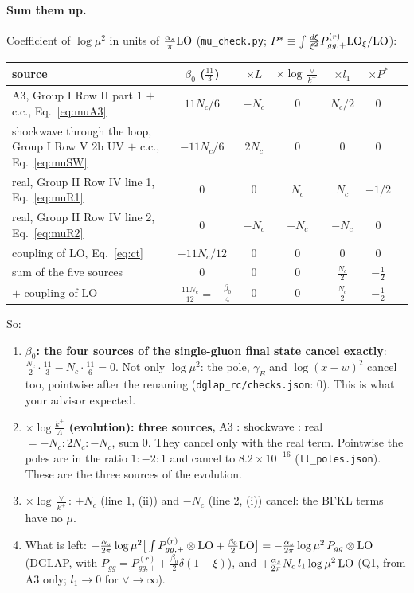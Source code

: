 \documentclass[10pt]{article}
\numberwithin{equation}{section}
\begin{document}
\paragraph{Sum them up.} Coefficient of $\log\mu^2$ in units of $\frac{\alpha_s}{\pi}{\rm LO}$ (\texttt{mu\_check.py}; $P^*\equiv\int\frac{d\xi}{\xi^2}P^{(r)}_{gg,+}{\rm LO}_\xi/{\rm LO}$):
{\small
\begin{longtable}{@{}p{}cccccc@{}}\toprule
source & $\beta_0$ ($\frac{11}{3}$) & $\times L$ & $\times\log\frac{\vee}{k^+}$ & $\times l_1$ & $\times P^*$\\\midrule
A3, Group I Row II part 1 $+$ c.c., Eq.~\eqref{eq:muA3} & $11N_c/6$ & $-N_c$ & $0$ & $N_c/2$ & $0$\\
shockwave through the loop, Group I Row V 2b UV $+$ c.c., Eq.~\eqref{eq:muSW} & $-11N_c/6$ & $2N_c$ & $0$ & $0$ & $0$\\
real, Group II Row IV line 1, Eq.~\eqref{eq:muR1} & $0$ & $0$ & $N_c$ & $N_c$ & $-1/2$\\
real, Group II Row IV line 2, Eq.~\eqref{eq:muR2} & $0$ & $-N_c$ & $-N_c$ & $-N_c$ & $0$\\
coupling of LO, Eq.~\eqref{eq:ct} & $-11N_c/12$ & $0$ & $0$ & $0$ & $0$\\
\midrule
sum of the five sources & $0$ & $0$ & $0$ & $\frac{N_c}{2}$ & $-\frac12$\\
$+$ coupling of LO & $-\frac{11N_c}{12}=-\frac{\beta_0}{4}$ & $0$ & $0$ & $\frac{N_c}{2}$ & $-\frac12$\\\bottomrule
\end{longtable}}
\noindent So:
\begin{enumerate}
\item \textbf{$\beta_0$: the four sources of the single-gluon final state cancel exactly}: $\frac{N_c}{2}\cdot\frac{11}{3}-N_c\cdot\frac{11}{6}=0$. Not only $\log\mu^2$: the pole, $\gamma_E$ and $\log(x-w)^2$ cancel too, pointwise after the renaming (\texttt{dglap\_rc/checks.json}: $0$). This is what your advisor expected.
\item \textbf{$\times\log\frac{k^+}{\Lambda}$ (evolution): three sources}, A3 : shockwave : real $=-N_c:2N_c:-N_c$, sum $0$. They cancel only with the real term. Pointwise the poles are in the ratio $1:-2:1$ and cancel to $8.2\times10^{-16}$ (\texttt{ll\_poles.json}). These are the three sources of the evolution.
\item \textbf{$\times\log\frac{\vee}{k^+}$}: $+N_c$ (line 1, (ii)) and $-N_c$ (line 2, (i)) cancel: the BFKL terms have no $\mu$.
\item What is left: $-\frac{\alpha_s}{2\pi}\log\mu^2\big[\int P^{(r)}_{gg,+}\otimes{\rm LO}+\frac{\beta_0}{2}{\rm LO}\big]=-\frac{\alpha_s}{2\pi}\log\mu^2\,P_{gg}\otimes{\rm LO}$ (DGLAP, with $P_{gg}=P^{(r)}_{gg,+}+\frac{\beta_0}{2}\delta(1-\xi)$), and $+\frac{\alpha_s}{2\pi}N_c\,l_1\log\mu^2\,{\rm LO}$ (Q1, from A3 only; $l_1\to0$ for $\vee\to\infty$).
\end{enumerate}
\end{document}
